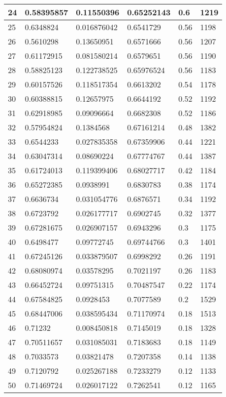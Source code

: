 \begin{longtable}{|l|l|l|l|l|l|}
24 & 0.58395857 & 0.11550396 & 0.65252143 & 0.6 & 1219 \\ \hline 
25 & 0.6348824 & 0.016876042 & 0.6541729 & 0.56 & 1198 \\ \hline 
26 & 0.5610298 & 0.13650951 & 0.6571666 & 0.56 & 1207 \\ \hline 
27 & 0.61172915 & 0.081580214 & 0.6579651 & 0.56 & 1190 \\ \hline 
28 & 0.58825123 & 0.122738525 & 0.65976524 & 0.56 & 1183 \\ \hline 
29 & 0.60157526 & 0.118517354 & 0.6613202 & 0.54 & 1178 \\ \hline 
30 & 0.60388815 & 0.12657975 & 0.6644192 & 0.52 & 1192 \\ \hline 
31 & 0.62918985 & 0.09096664 & 0.6682308 & 0.52 & 1186 \\ \hline 
32 & 0.57954824 & 0.1384568 & 0.67161214 & 0.48 & 1382 \\ \hline 
33 & 0.6544233 & 0.027835358 & 0.67359906 & 0.44 & 1221 \\ \hline 
34 & 0.63047314 & 0.08690224 & 0.67774767 & 0.44 & 1387 \\ \hline 
35 & 0.61724013 & 0.119399406 & 0.68027717 & 0.42 & 1184 \\ \hline 
36 & 0.65272385 & 0.0938991 & 0.6830783 & 0.38 & 1174 \\ \hline 
37 & 0.6636734 & 0.031054776 & 0.6876571 & 0.34 & 1192 \\ \hline 
38 & 0.6723792 & 0.026177717 & 0.6902745 & 0.32 & 1377 \\ \hline 
39 & 0.67281675 & 0.026907157 & 0.6943296 & 0.3 & 1175 \\ \hline 
40 & 0.6498477 & 0.09772745 & 0.69744766 & 0.3 & 1401 \\ \hline 
41 & 0.67245126 & 0.033879507 & 0.6998292 & 0.26 & 1191 \\ \hline 
42 & 0.68080974 & 0.03578295 & 0.7021197 & 0.26 & 1183 \\ \hline 
43 & 0.66452724 & 0.09751315 & 0.70487547 & 0.22 & 1174 \\ \hline 
44 & 0.67584825 & 0.0928453 & 0.7077589 & 0.2 & 1529 \\ \hline 
45 & 0.68447006 & 0.038595434 & 0.71170974 & 0.18 & 1513 \\ \hline 
46 & 0.71232 & 0.008450818 & 0.7145019 & 0.18 & 1328 \\ \hline 
47 & 0.70511657 & 0.031085031 & 0.7183683 & 0.18 & 1149 \\ \hline 
48 & 0.7033573 & 0.03821478 & 0.7207358 & 0.14 & 1138 \\ \hline 
49 & 0.7120792 & 0.025267188 & 0.7233279 & 0.12 & 1133 \\ \hline 
50 & 0.71469724 & 0.026017122 & 0.7262541 & 0.12 & 1165 \\ \hline 
\end{longtable}